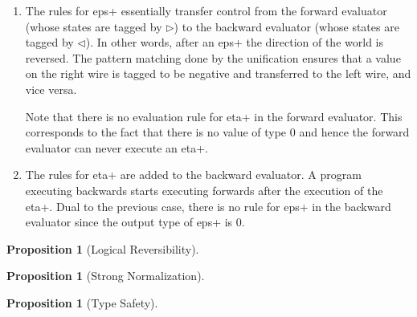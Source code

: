 \documentclass[preprint]{sigplanconf}
\newtheorem{proposition}[theorem]{Proposition}
\begin{document}
  \begin{enumerate}
  \item The rules for {{eps+}} essentially transfer control from the
    forward evaluator (whose states are tagged by $\triangleright$) to
    the backward evaluator (whose states are tagged by
    $\triangleleft$). In other words, after an {{eps+}} the direction
    of the world is reversed. The pattern matching done by the
    unification ensures that a value on the {{right}} wire is tagged
    to be negative and transferred to the {{left}} wire, and vice versa.


    Note that there is no evaluation rule for {{eta+}} in the forward
    evaluator. This corresponds to the fact that there is no value of
    type {{0}} and hence the forward evaluator can never execute an
    {{eta+}}.

    \item The rules for {{eta+}} are added to the backward evaluator. A
      program executing backwards starts executing forwards after the
      execution of the {{eta+}}. Dual to the previous case, there is
      no rule for {{eps+}} in the backward evaluator since the output
      type of {{eps+}} is {{0}}.


  \end{enumerate}


\begin{proposition}[Logical Reversibility]
  
\end{proposition}

\begin{proposition}[Strong Normalization]
  
\end{proposition}

\begin{proposition}[Type Safety]
  
\end{proposition}
\end{document}
